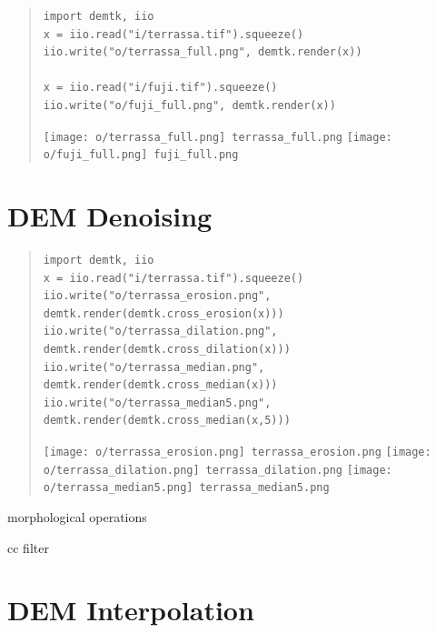 \begin{quote}
\begin{verbatim}
import demtk, iio
x = iio.read("i/terrassa.tif").squeeze()
iio.write("o/terrassa_full.png", demtk.render(x))

x = iio.read("i/fuji.tif").squeeze()
iio.write("o/fuji_full.png", demtk.render(x))
\end{verbatim}
\texttt{[image: o/terrassa\_full.png]}~\verb+terrassa_full.png+
\texttt{[image: o/fuji\_full.png]}~\verb+fuji_full.png+
\end{quote}



\section{DEM Denoising}

\begin{quote}
\begin{verbatim}
import demtk, iio
x = iio.read("i/terrassa.tif").squeeze()
iio.write("o/terrassa_erosion.png",  demtk.render(demtk.cross_erosion(x)))
iio.write("o/terrassa_dilation.png", demtk.render(demtk.cross_dilation(x)))
iio.write("o/terrassa_median.png", demtk.render(demtk.cross_median(x)))
iio.write("o/terrassa_median5.png", demtk.render(demtk.cross_median(x,5)))
\end{verbatim}
\texttt{[image: o/terrassa\_erosion.png]}~\verb+terrassa_erosion.png+
\texttt{[image: o/terrassa\_dilation.png]}~\verb+terrassa_dilation.png+
\texttt{[image: o/terrassa\_median5.png]}~\verb+terrassa_median5.png+
\end{quote}


morphological operations

cc filter


\section{DEM Interpolation}

